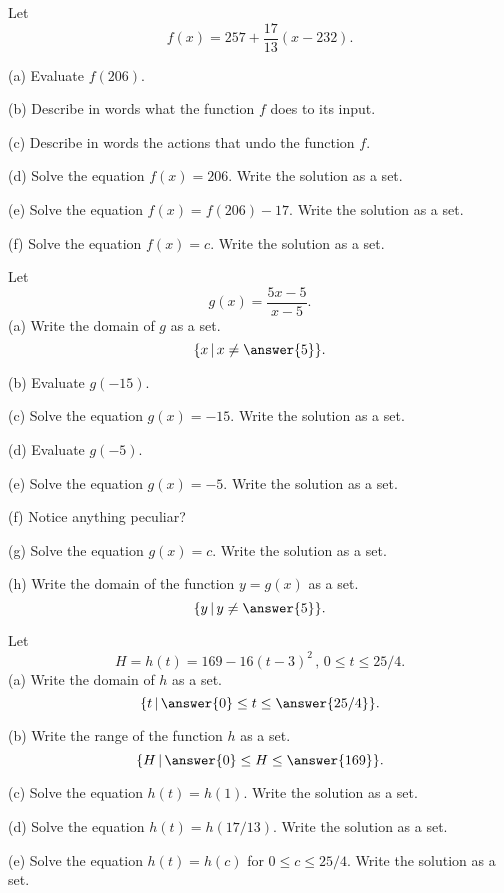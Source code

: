 \documentclass{ximera}
\begin{document}
\begin{question} \label{Q38742433}
Let 
\[
     f(x) = 257 + \frac{17}{13}(x-232).
\]

(a) Evaluate $f(206)$.

(b) Describe in words what the function $f$ does to its input.

(c) Describe in words the actions that undo the function $f$.

(d) Solve the equation $f(x) = 206$. Write the solution as a set.

(e) Solve the equation $f(x)=f(206) - 17$. Write the solution as a set.

(f) Solve the equation $f(x)=c$. Write the solution as a set.

\end{question}


\begin{question}  \label{Qdfr4545r443243}
Let
\[
        g(x) = \frac{5x-5}{x-5} . 
\]
(a) Write the domain of $g$ as a set.
\[
  \{ x \, | \, x \neq \answer{5} \}.
\]

(b) Evaluate $g(-15)$.

(c) Solve the equation $g(x)=-15$. Write the solution as a set.

(d) Evaluate $g(-5)$.

(e) Solve the equation $g(x)=-5$. Write the solution as a set.

(f) Notice anything peculiar?

(g) Solve the equation $g(x)=c$. Write the solution as a set.

(h) Write the domain of the function $y=g(x)$ as a set.
\[
     \{ y \, | \, y \neq \answer{5} \}.
\]
\end{question}

\begin{question}  \label{Q9830449}
Let
\[
      H= h(t) = 169 - 16(t-3)^2 \, , \, 0\leq t \leq 25/4 .
\]
(a) Write the domain of $h$ as a set.
\[
  \{ t \, | \, \answer{0} \leq t \leq \answer{25/4} \}.
\]

(b) Write the range of the function $h$ as a set.
\[
    \{ H \, | \, \answer{0} \leq H \leq \answer{169} \}.
\]

(c) Solve the equation $h(t) = h(1)$. Write the solution as a set.

(d) Solve the equation $h(t) = h(17/13)$. Write the solution as a set.

(e) Solve the equation $h(t) = h(c)$ for $0\leq c \leq 25/4$. Write the solution as a set.

\end{question}
\end{document}
